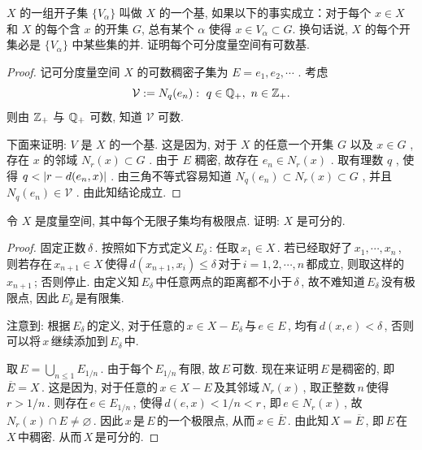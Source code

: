 \documentclass{article}
\begin{document}
\begin{problem}[2-23]
    \( X \) 的一组开子集 \( \{V_\alpha\} \) 叫做 \( X \) 的一个基, 如果以下的事实成立：对于每个 \( x\in X \) 和 \( X \) 的每个含 \( x \) 的开集 \( G \), 总有某个 \( \alpha \) 使得 \( x\in V_\alpha\subset G \). 换句话说, \( X \)
    的每个开集必是 \( \{V_\alpha\} \) 中某些集的并. 证明每个可分度量空间有可数基. 
\end{problem}

\begin{proof}
    记可分度量空间 \( X \) 的可数稠密子集为 \( E={e_1,e_2,\cdots} \) . 考虑
    \[ \mathcal{V}:={N_q(e_n):\ q\in\Q_+,\ n\in\Z_+}. \]
    则由 \( \mathbb{Z}_+ \) 与 \( \mathbb{Q}_+ \) 可数, 知道 \( \mathcal{V} \) 可数. \par
    下面来证明: \( V \) 是 \( X \) 的一个基. 这是因为, 对于 \( X \) 的任意一个开集 \( G \) 以及 \( x\in G \) , 存在 \( x \) 的邻域 \( N_r(x)\subset G \) . 由于 \( E \) 稠密, 故存在 \( e_n\in N_r(x) \) . 取有理数 \( q \) , 使得 \( q<\left|r-d(e_n,x)\right| \) . 由三角不等式容易知道 \( N_q(e_n)\subset N_r(x)\subset G \) , 并且 \( N_q(e_n)\in \mathcal{V} \) . 由此知结论成立.
\end{proof}

\begin{problem}[2-24]
    令 \( X \) 是度量空间, 其中每个无限子集均有极限点. 证明:  \( X \) 是可分的.
\end{problem}

\begin{proof}
    固定正数\,\( \delta \)\,. 按照如下方式定义\,\( E_\delta \)\,: 任取\,\( x_1\in X \)\,. 若已经取好了\,\( x_1,\cdots,x_n \)\,, 则若存在\,\( x_{n+1}\in X \)\,使得\,\( d(x_{n+1},x_i)\le\delta \)\,对于\,\( i=1,2,\cdots,n \)\,都成立, 则取这样的\,\( x_{n+1} \)\,; 否则停止. 由定义知\,\( E_\delta \)\,中任意两点的距离都不小于\,\( \delta \)\,, 故不难知道\,\( E_\delta \)\,没有极限点, 因此\,\( E_\delta \)\,是有限集. \par
    注意到: 根据\,\( E_{\delta} \)\,的定义, 对于任意的\,\( x\in X-E_{\delta} \)\,与\,\( e\in E \)\,, 均有\,\( d(x,e)<\delta \)\,, 否则可以将\,\( x \)\,继续添加到\,\( E_{\delta} \)\,中.\par
    取\,\( E=\bigcup_{n\le 1}E_{1/n} \)\,. 由于每个\,\( E_{1/n} \)\,有限, 故\,\( E \)\,可数. 现在来证明\,\( E \)\,是稠密的, 即\,\( \overline{E}=X \)\,. 这是因为, 对于任意的\,\( x\in X-E \)\,及其邻域\,\( N_r(x) \)\,, 取正整数\,\( n \)\,使得\,\( r>1/n \)\,. 则存在\,\( e\in E_{1/n} \)\,, 使得\,\( d(e,x)<1/n<r \)\,, 即\,\( e\in N_r(x) \)\,, 故\,\( N_r(x)\cap E\neq\varnothing \)\,. 因此\,\( x \)\,是\,\( E \)\,的一个极限点, 从而\,\( x\in\overline{E} \)\,. 由此知\,\( X=\overline{E} \)\,, 即\,\( E \)\,在\,\( X \)\,中稠密. 从而\,\( X \)\,是可分的.
\end{proof}
\end{document}
